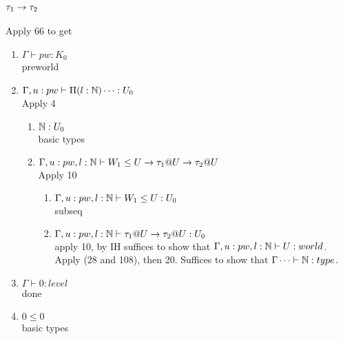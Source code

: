 \message{ !name(paper.tex)}\documentclass{article}
\begin{document}
\subsection{$\tau_1 \rightarrow \tau_2$}
    Apply 66 to get
    \begin{enumerate}
        \item $\Gamma \vdash pw : K_0$\\
        preworld
        \item $\Gamma, u: pw \vdash \Pi(l: \mathbb{N}) \dots :U_0$\\
        Apply 4
        \begin{enumerate}
            \item $\mathbb{N} : U_0$\\
            basic types
            \item $\Gamma, u: pw, l : \mathbb{N} \vdash 
            W_1 \leq U \rightarrow \tau_1@U \rightarrow \tau_2@U
            $\\
            Apply 10
            \begin{enumerate}
                \item $\Gamma, u: pw, l : \mathbb{N} \vdash 
            W_1 \leq U : U_0$\\
            subseq
            \item $\Gamma, u: pw, l : \mathbb{N} \vdash \tau_1@U \rightarrow \tau_2@U : U_0$\\
            apply 10, by IH suffices to show that 
            $\Gamma, u: pw, l : \mathbb{N} \vdash U: world$. Apply (28 and 108), then 20. Suffices to show that 
            $\Gamma \dots \vdash \mathbb{N}: type$.
            \end{enumerate}
        \end{enumerate}
        \item $\Gamma \vdash 0: level$\\
        done
        \item $0 \leq 0$\\
       basic types
    \end{enumerate}
\end{document}
